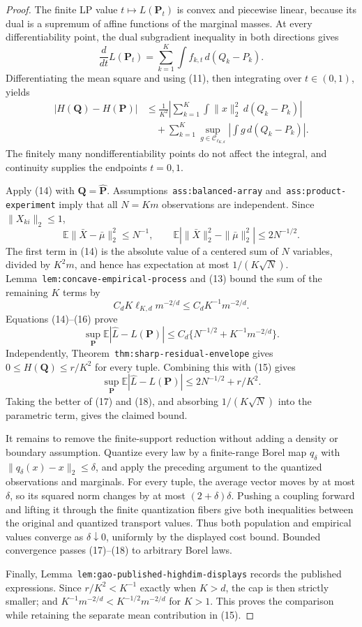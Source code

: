 \documentclass{article}
\begin{document}
\begin{proof}
The finite LP value \(t\mapsto L(\mathbf P_t)\) is convex and piecewise linear, because its dual is a supremum of affine functions of the marginal masses. At every differentiability point, the dual subgradient inequality in both directions gives
\[
\frac d{dt}L(\mathbf P_t)=\sum_{k=1}^K\int f_{k,t}\,d(Q_k-P_k).
\]
Differentiating the mean square and using (11), then integrating over \(t\in(0,1)\), yields
\[
\begin{aligned}
|H(\mathbf Q)-H(\mathbf P)|
&\le \frac1{K^2}\left|\sum_{k=1}^K\int\|x\|_2^2\,d(Q_k-P_k)\right|\\
&\quad+\sum_{k=1}^K\sup_{g\in\mathcal C_{\ell_{K,d}}}
\left|\int g\,d(Q_k-P_k)\right|. \tag{14}
\end{aligned}
\]
The finitely many nondifferentiability points do not affect the integral, and continuity supplies the endpoints \(t=0,1\).

Apply (14) with \(\mathbf Q=\widehat{\mathbf P}\). Assumptions~\texttt{ass:balanced-array} and~\texttt{ass:product-experiment} imply that all \(N=Km\) observations are independent. Since \(\|X_{ki}\|_2\le1\),
\[
\mathbb E\|\bar X-\bar\mu\|_2^2\le N^{-1},\qquad
\mathbb E|\|\bar X\|_2^2-\|\bar\mu\|_2^2|\le2N^{-1/2}. \tag{15}
\]
The first term in (14) is the absolute value of a centered sum of \(N\) variables, divided by \(K^2m\), and hence has expectation at most \(1/(K\sqrt N)\). Lemma~\texttt{lem:concave-empirical-process} and (13) bound the sum of the remaining \(K\) terms by
\[
C_dK\ell_{K,d}m^{-2/d}\le C_dK^{-1}m^{-2/d}. \tag{16}
\]
Equations (14)--(16) prove
\[
\sup_{\mathbf P}\mathbb E|\widehat L-L(\mathbf P)|
\le C_d\{N^{-1/2}+K^{-1}m^{-2/d}\}. \tag{17}
\]
Independently, Theorem~\texttt{thm:sharp-residual-envelope} gives \(0\le H(\mathbf Q)\le r/K^2\) for every tuple. Combining this with (15) gives
\[
\sup_{\mathbf P}\mathbb E|\widehat L-L(\mathbf P)|
\le2N^{-1/2}+r/K^2. \tag{18}
\]
Taking the better of (17) and (18), and absorbing \(1/(K\sqrt N)\) into the parametric term, gives the claimed bound.

It remains to remove the finite-support reduction without adding a density or boundary assumption. Quantize every law by a finite-range Borel map \(q_\delta\) with \(\|q_\delta(x)-x\|_2\le\delta\), and apply the preceding argument to the quantized observations and marginals. For every tuple, the average vector moves by at most \(\delta\), so its squared norm changes by at most \((2+\delta)\delta\). Pushing a coupling forward and lifting it through the finite quantization fibers give both inequalities between the original and quantized transport values. Thus both population and empirical values converge as \(\delta\downarrow0\), uniformly by the displayed cost bound. Bounded convergence passes (17)--(18) to arbitrary Borel laws.

Finally, Lemma~\texttt{lem:gao-published-highdim-displays} records the published expressions. Since \(r/K^2<K^{-1}\) exactly when \(K>d\), the cap is then strictly smaller; and \(K^{-1}m^{-2/d}<K^{-1/2}m^{-2/d}\) for \(K>1\). This proves the comparison while retaining the separate mean contribution in (15).
\end{proof}
\end{document}
